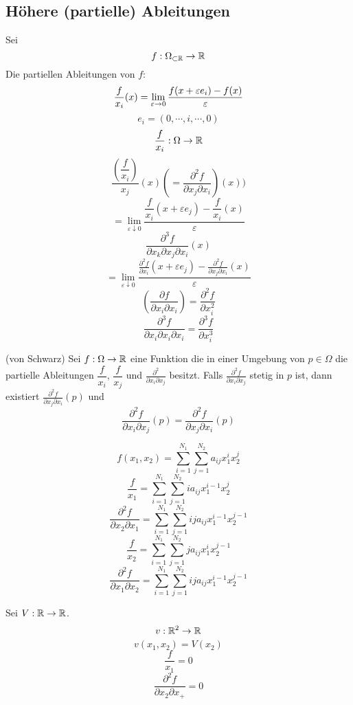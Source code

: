 \subsection{Höhere (partielle) Ableitungen}
Sei
\[f:\Omega_{\subset\mathbb{R}}\rightarrow\mathbb{R}\]
Die partiellen Ableitungen von $f$:
\[\dfrac{f}{x_i}(x)=\displaystyle\lim_{\varepsilon\rightarrow0}\frac{f(x+\varepsilon e_i)-f(x)}{\varepsilon}\]
\[e_i=(0,\cdots,i,\cdots,0)\]
\[\dfrac{f}{x_i}:\Omega\rightarrow\mathbb{R}\]
\[\dfrac{\left( \dfrac{f}{x_i} \right)}{x_j}(x)\left(=\frac{\partial^2f}{\partial x_j\partial x_i} \right)(x))\]
\[=\lim_{\varepsilon\downarrow 0}\frac{\dfrac{f}{x_i}(x+\varepsilon e_j)-\dfrac{f}{x_i}(x)}{\varepsilon}\]
\[\frac{\partial^3f}{\partial x_k\partial x_j \partial x_i}(x)\]
\[=\lim_{\varepsilon\downarrow 0}\frac{\frac{\partial^2f}{\partial x_i}(x+\varepsilon e_j)-\frac{\partial ^2f}{\partial x_j \partial x_i}(x)}{\varepsilon}\]
\[\left( \frac{\partial f}{\partial x_i \partial x_i} \right)=\frac{\partial^2 f}{\partial x_i^2}\]
\[\frac{\partial^3 f}{\partial x_i \partial x_i \partial x_i}=\frac{\partial^3 f}{\partial x_i^3}\]
\begin{Sat}
  (von Schwarz) Sei $f:\Omega\rightarrow\mathbb{R}$ eine Funktion die in einer Umgebung von $p\in\Omega$ die partielle Ableitungen $\dfrac{f}{x_i}$, $\dfrac{f}{x_j}$ und $\frac{\partial^2}{\partial x_i \partial x_j}$ besitzt. Falls $\frac{\partial^2 f}{\partial x_i \partial x_j}$ stetig in $p$ ist, dann existiert $\frac{\partial^2 f}{\partial x_j\partial x_i}(p)$ und
  \[\frac{\partial^2 f}{\partial x_i\partial x_j}(p)=\frac{\partial^2 f}{\partial x_j\partial x_i}(p)\]
\end{Sat}
\begin{Bsp}
  \[f(x_1,x_2)=\sum_{i=1}^{N_1}\sum_{j=1}^{N_2}a_{ij}x_1^ix_2^j\]
  \[\dfrac{f}{x_1}=\sum_{i=1}^{N_1}\sum_{j=1}^{N_2}ia_{ij}x_1^{i-1}x_2^j\]
  \[\frac{\partial^2 f}{\partial x_2\partial x_1}=\sum_{i=1}^{N_1}\sum_{j=1}^{N_2}ija_{ij}x_1^{i-1}x_2^{j-1}\]
  \[\dfrac{f}{x_2}=\sum_{i=1}^{N_1}\sum_{j=1}^{N_2}ja_{ij}x_1^ix_2^{j-1}\]
  \[\frac{\partial^2 f}{\partial x_1\partial x_2}=\sum_{i=1}^{N_1}\sum_{j=1}^{N_2}ija_{ij}x_1^{i-1}x_2^{j-1}\]
\end{Bsp}
\begin{Bsp}
  Sei $V:\mathbb{R}\rightarrow\mathbb{R}$.
  \[v:\mathbb{R}^2\rightarrow\mathbb{R}\]
  \[v(x_1,x_2)=V(x_2)\]
  \[\dfrac{f}{x_1}=0\]
  \[\frac{\partial^2f}{\partial x_2\partial x_+}=0\]
\end{Bsp}
